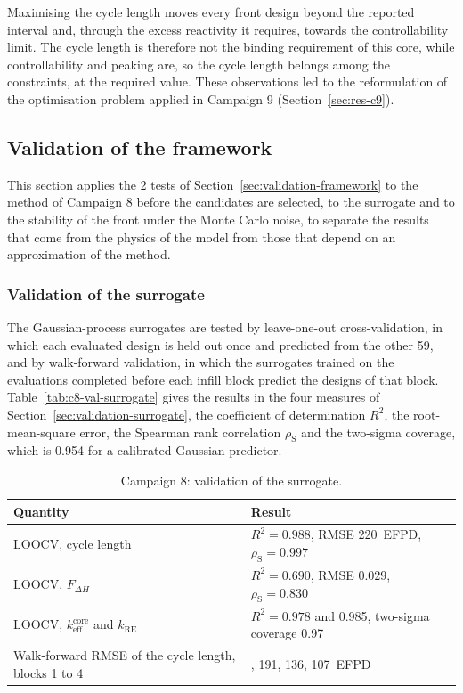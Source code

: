 Maximising the cycle length moves every front design beyond the
reported interval and, through the excess reactivity it requires,
towards the controllability limit. The cycle length is therefore not
the binding requirement of this core, while controllability and peaking
are, so the cycle length belongs among the constraints, at the required
value. These observations led to the reformulation of the optimisation
problem applied in Campaign 9 (Section~\ref{sec:res-c9}).

\subsection{Validation of the framework}
\label{sec:res-c8-validation}
\label{tab:c8-cv-loo}\label{fig:c8-cv-loo}\label{fig:c8-cv-walkforward}\label{tab:c8-front-stability}\label{fig:c8-stab-chrono}\label{fig:c8-stab-robust}

This section applies the 2 tests of
Section~\ref{sec:validation-framework} to the method of Campaign 8
before the candidates are selected, to the surrogate and to the
stability of the front under the Monte Carlo noise, to separate the
results that come from the physics of the model from those that
depend on an approximation of the method.

\subsubsection{Validation of the surrogate}
\label{sec:res-c8-cv}
The Gaussian-process surrogates are tested by leave-one-out
cross-validation, in which each evaluated design is held out once and
predicted from the other 59, and by walk-forward validation, in which
the surrogates trained on the evaluations completed before each infill
block predict the designs of that block.
Table~\ref{tab:c8-val-surrogate} gives the results in the four
measures of Section~\ref{sec:validation-surrogate}, the coefficient of
determination $R^2$, the root-mean-square error, the Spearman rank
correlation $\rho_\mathrm{S}$ and the two-sigma coverage, which is
0.954 for a calibrated Gaussian predictor.

\begin{table}[htbp]
  \centering
  \small
  \caption{Campaign 8: validation of the surrogate.}
  \label{tab:c8-val-surrogate}\label{tab:c8-validation}
  \begin{tabularx}{\textwidth}{@{}>{\raggedright\arraybackslash}p{}>{\raggedright\arraybackslash}X@{}}
    \toprule
    Quantity & Result \\
    \midrule
    LOOCV, cycle length & $R^2 = 0.988$, RMSE \SI{220}{EFPD}, $\rho_\mathrm{S} = 0.997$ \\
    LOOCV, $F_{\Delta H}$ & $R^2 = 0.690$, RMSE 0.029, $\rho_\mathrm{S} = 0.830$ \\
    LOOCV, $k_\mathrm{eff}^\mathrm{core}$ and $k_\mathrm{RE}$ & $R^2 = 0.978$ and 0.985, two-sigma coverage 0.97 \\
    Walk-forward RMSE of the cycle length, blocks 1 to 4 & 285, 191, 136, \SI{107}{EFPD} \\
    \bottomrule
  \end{tabularx}
\end{table}

